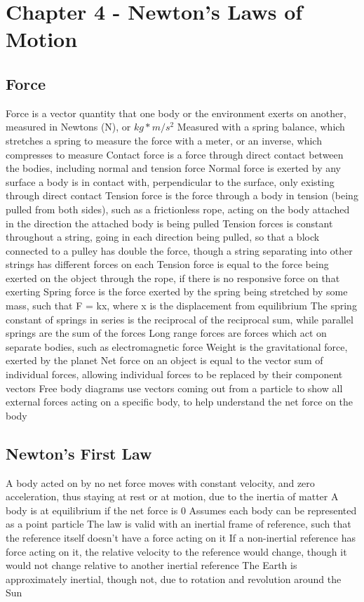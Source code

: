 \documentclass[11 pt, twoside]{article}
\newenvironment{outline*}
{
	\begin{outline}[enumerate]
	}
	{\end{outline}
}
\begin{document}
\section{Chapter 4 - Newton's Laws of Motion}
\subsection{Force}
\begin{outline*}
\1 Force is a vector quantity that one body or the environment exerts on another, measured in Newtons (N), or $kg*m/s^2$
\2 Measured with a spring balance, which stretches a spring to measure the force with a meter, or an inverse, which compresses to measure
\1 Contact force is a force through direct contact between the bodies, including normal and tension force
\2 Normal force is exerted by any surface a body is in contact with, perpendicular to the surface, only existing through direct contact
\1 Tension force is the force through a body in tension (being pulled from both sides), such as a frictionless rope, acting on the body attached in the direction the attached body is being pulled
\2 Tension forces is constant throughout a string, going in each direction being pulled, so that a block connected to a pulley has double the force, though a string separating into other strings has different forces on each
\2 Tension force is equal to the force being exerted on the object through the rope, if there is no responsive force on that exerting
\1 Spring force is the force exerted by the spring being stretched by some mass, such that F = kx, where x is the displacement from equilibrium
\2 The spring constant of springs in series is the reciprocal of the reciprocal sum, while parallel springs are the sum of the forces
\1 Long range forces are forces which act on separate bodies, such as electromagnetic force
\2 Weight is the gravitational force, exerted by the planet
\1 Net force on an object is equal to the vector sum of individual forces, allowing individual forces to be replaced by their component vectors
\1 Free body diagrams use vectors coming out from a particle to show all external forces acting on a specific body, to help understand the net force on the body
\end{outline*}
\subsection{Newton’s First Law}
\begin{outline*}
\1 A body acted on by no net force moves with constant velocity, and zero acceleration, thus staying at rest or at motion, due to the inertia of matter
\2 A body is at equilibrium if the net force is 0
\2 Assumes each body can be represented as a point particle
\1 The law is valid with an inertial frame of reference, such that the reference itself doesn’t have a force acting on it
\2 If a non-inertial reference has force acting on it, the relative velocity to the reference would change, though it would not change relative to another inertial reference
\2 The Earth is approximately inertial, though not, due to rotation and revolution around the Sun
\end{outline*}
\end{document}
